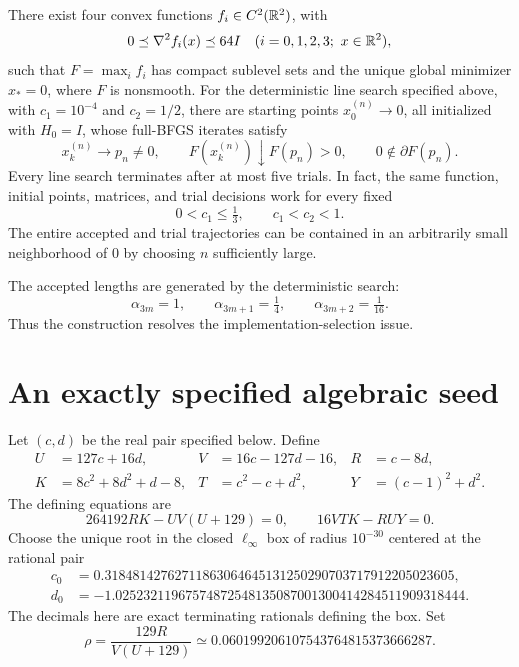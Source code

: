 \begin{theorem}\label{D:main}
There exist four convex functions $f_i\in C^2(\mathbb R^2)$, with
\[
 0\preceq\nabla^2 f_i(x)\preceq64I \quad(i=0,1,2,3;\ x\in\mathbb R^2),
\]
such that $F=\max_i f_i$ has compact sublevel sets and the unique global minimizer $x_*=0$, where $F$ is nonsmooth. For the deterministic line search specified above, with $c_1=10^{-4}$ and $c_2=1/2$, there are starting points $x_0^{(n)}\to0$, all initialized with $H_0=I$, whose full-BFGS iterates satisfy
\[
 x_k^{(n)}\longrightarrow p_n\ne0,\qquad
 F(x_k^{(n)})\downarrow F(p_n)>0,\qquad 0\notin\partial F(p_n).
\]
Every line search terminates after at most five trials. In fact, the same function, initial points, matrices, and trial decisions work for every fixed
\[
 0<c_1\le\tfrac13,\qquad c_1<c_2<1.
\]
The entire accepted and trial trajectories can be contained in an arbitrarily small neighborhood of $0$ by choosing $n$ sufficiently large.
\end{theorem}

The accepted lengths are generated by the deterministic search:
\[
 \boxed{\alpha_{3m}=1,\qquad\alpha_{3m+1}=\tfrac14,\qquad\alpha_{3m+2}=\tfrac1{16}.}
\]
Thus the construction resolves the implementation-selection issue.


\setcounter{section}{1}
\setcounter{theorem}{1}
\setcounter{lemma}{0}
\setcounter{corollary}{0}
\setcounter{proposition}{0}
\setcounter{remark}{0}
\setcounter{equation}{1}


\section{An exactly specified algebraic seed}

Let $(c,d)$ be the real pair specified below. Define
\begin{align*}
 U&=127c+16d,& V&=16c-127d-16,& R&=c-8d,\\
 K&=8c^2+8d^2+d-8,& T&=c^2-c+d^2,& Y&=(c-1)^2+d^2.
\end{align*}
The defining equations are
\begin{equation}\label{D:polys}
 \boxed{264192RK-U V(U+129)=0,\qquad16VTK-RUY=0.}
\end{equation}
Choose the unique root in the closed $\ell_\infty$ box of radius $10^{-30}$ centered at the rational pair
\begin{align*}
 c_0&=0.31848142762711863064645131250290703717912205023605,\\
 d_0&=-1.02523211967574872548135087001300414284511909318444.
\end{align*}
The decimals here are exact terminating rationals defining the box. Set
\begin{equation}\label{D:rho}
 \rho=\frac{129R}{V(U+129)}
       \simeq0.060199206107543764815373666287.
\end{equation}

